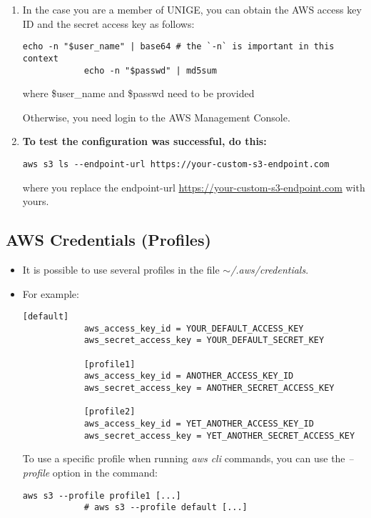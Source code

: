 \documentclass[12pt, a4paper]{article}
\numberwithin{equation}{section}
\theoremstyle{definition}
\theoremstyle{definition}
\begin{document}
\begin{enumerate}
		\item In the case you are a member of UNIGE, you can obtain the AWS access key ID and the secret access key as follows:
		
		\begin{lstlisting}[style=mystylebash, label=alg:aws__access_secret_key, xleftmargin=\parindent]
			echo -n "$user_name" | base64 # the `-n` is important in this context
			echo -n "$passwd" | md5sum
		\end{lstlisting}
		
		where \$user\_name and \$passwd need to be provided
		
		Otherwise, you need login to the AWS Management Console. 
		
		\item \textbf{To test the configuration was successful, do this:}
		
		\begin{lstlisting}[style=mystylebash, label=alg:aws_configure_test, xleftmargin=\parindent]
			aws s3 ls --endpoint-url https://your-custom-s3-endpoint.com
		\end{lstlisting}
		
		where you replace the endpoint-url \url{https://your-custom-s3-endpoint.com} with yours.
		
	\end{enumerate}

	\subsection{AWS Credentials (Profiles)}
	
	\begin{itemize}
		\item It is possible to use several profiles in the file \textit{$\sim$/.aws/credentials}. 
		\item For example:
		
		\begin{lstlisting}[style=mystylebash, label=alg:aws_profiles, xleftmargin=\parindent]
			[default]
			aws_access_key_id = YOUR_DEFAULT_ACCESS_KEY
			aws_secret_access_key = YOUR_DEFAULT_SECRET_KEY
			
			[profile1]                                                                   
			aws_access_key_id = ANOTHER_ACCESS_KEY_ID
			aws_secret_access_key = ANOTHER_SECRET_ACCESS_KEY
			
			[profile2]
			aws_access_key_id = YET_ANOTHER_ACCESS_KEY_ID
			aws_secret_access_key = YET_ANOTHER_SECRET_ACCESS_KEY
		\end{lstlisting}
	
		To use a specific profile when running \textit{aws cli} commands, you can use the \textit{--profile} option in the command:
		
		\begin{lstlisting}[style=mystylebash, label=alg:aws_cli__profile, xleftmargin=\parindent]
			aws s3 --profile profile1 [...]
			# aws s3 --profile default [...]
		\end{lstlisting}
		
	\end{itemize}
\end{document}
